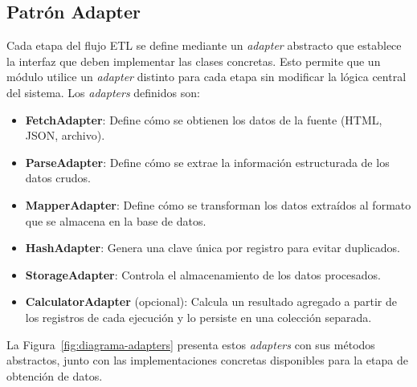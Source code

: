 \documentclass[12pt,letterpaper,oneside]{report}
\begin{document}
\subsection{Patr\'on Adapter}
\label{sec:patron-adapter}

Cada etapa del flujo ETL se define mediante un \textit{adapter} abstracto que establece la interfaz que deben implementar las clases concretas. Esto permite que un m\'odulo utilice un \textit{adapter} distinto para cada etapa sin modificar la l\'ogica central del sistema. Los \textit{adapters} definidos son:

\begin{itemize}
  \item \textbf{FetchAdapter}: Define c\'omo se obtienen los datos de la fuente (HTML, JSON, archivo).
  \item \textbf{ParseAdapter}: Define c\'omo se extrae la informaci\'on estructurada de los datos crudos.
  \item \textbf{MapperAdapter}: Define c\'omo se transforman los datos extra\'idos al formato que se almacena en la base de datos.
  \item \textbf{HashAdapter}: Genera una clave \'unica por registro para evitar duplicados.
  \item \textbf{StorageAdapter}: Controla el almacenamiento de los datos procesados.
  \item \textbf{CalculatorAdapter} (opcional): Calcula un resultado agregado a partir de los registros de cada ejecuci\'on y lo persiste en una colecci\'on separada.
\end{itemize}

La Figura~\ref{fig:diagrama-adapters} presenta estos \textit{adapters} con sus m\'etodos abstractos, junto con las implementaciones concretas disponibles para la etapa de obtenci\'on de datos.
\end{document}
